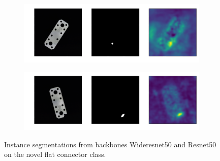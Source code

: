 
\begin{figure}[htbp]
    \centering
    \begin{subfigure}[b]{0.4\textwidth}
        \includegraphics[width=\textwidth]{figures/backboneexamples/flat_connector_test_logical_anomalies_033.png}

    \end{subfigure}
    \begin{subfigure}[b]{0.4\textwidth}
        \includegraphics[width=\textwidth]{figures/backboneexamples/flat_connector_test_structural_anomalies_001.png}

    \end{subfigure}
    \caption{Instance segmentations from backbones Wideresnet50 \cite{wideresnet} and Resnet50 \cite{He_2016resnet} on the novel flat connector class.}
    \label{fig:singlebackboneexamples}
\end{figure}